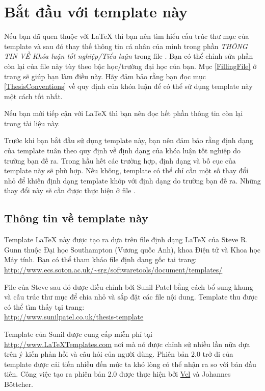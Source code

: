 \section{Bắt đầu với template này}

Nếu bạn đã quen thuộc với \LaTeX{} thì bạn nên tìm hiểu cấu trúc thư mục của template và sau đó thay thế thông tin cá nhân của mình trong phần \emph{THÔNG TIN VỀ Khóa luận tốt nghiệp/Tiểu luận} trong file . Bạn có thể chỉnh sửa phần còn lại của file này tùy theo bậc học/trường đại học của bạn. Mục \ref{FillingFile} ở trang \pageref{FillingFile} sẽ giúp bạn làm điều này. Hãy đảm bảo rằng bạn đọc mục \ref{ThesisConventions} về quy định của khóa luận để có thể sử dụng template này một cách tốt nhất.

Nếu bạn mới tiếp cận với \LaTeX{} thì bạn nên đọc hết phần thông tin còn lại trong tài liệu này.

Trước khi bạn bắt đầu sử dụng template này, bạn nên đảm bảo rằng định dạng của template tuân theo quy định về định dạng của khóa luận tốt nghiệp do trường bạn đề ra. Trong hầu hết các trường hợp, định dạng và bố cục của template này sẽ phù hợp. Nếu không, template có thể chỉ cần một số thay đổi nhỏ để khiến định dạng template khớp với định dạng do trường bạn đề ra. Những thay đổi này sẽ cần được thực hiện ở file .


\subsection{Thông tin về template này}

Template \LaTeX{} này được tạo ra dựa trên file định dạng \LaTeX{} của Steve R. Gunn thuộc Đại học Southampton (Vương quốc Anh), khoa Điện tử và Khoa học Máy tính. Bạn có thể tham khảo file định dạng gốc tại trang:
\url{http://www.ecs.soton.ac.uk/~srg/softwaretools/document/templates/}

File  của Steve sau đó được điều chỉnh bởi Sunil Patel bằng cách bổ sung khung và cấu trúc thư mục để chia nhỏ và sắp đặt các file nội dung. Template thu được có thể tìm thấy tại trang:\\
\url{http://www.sunilpatel.co.uk/thesis-template}

Template của Sunil được cung cấp miễn phí tại \url{http://www.LaTeXTemplates.com} nơi mà nó được chỉnh sử nhiều lần nữa dựa trên ý kiến phản hồi và câu hỏi của người dùng. Phiên bản 2.0 trở đi của template được cải tiến nhiều đến mức ta khó lòng có thể nhận ra so với bản đầu tiên. Công việc tạo ra phiên bản 2.0 được thực hiện bởi \href{mailto:vel@latextemplates.com}{Vel} và Johannes Böttcher.


